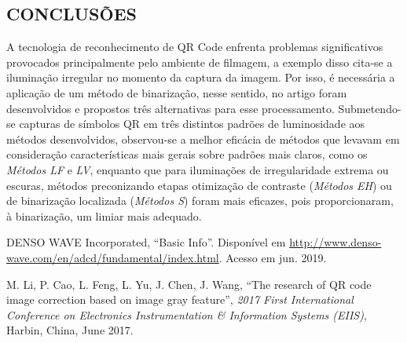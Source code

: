 \documentclass{ceel}
\begin{document}
\begin{multicols}{2}
\section{CONCLUSÕES}
A tecnologia de reconhecimento de QR Code enfrenta problemas significativos provocados principalmente pelo ambiente de filmagem, a exemplo disso cita-se a iluminação irregular no momento da captura da imagem. Por isso, é necessária a aplicação de um método de binarização, nesse sentido, no artigo foram desenvolvidos e propostos três alternativas para esse processamento. Submetendo-se capturas de símbolos QR em três distintos padrões de luminosidade aos métodos desenvolvidos, observou-se a melhor eficácia de métodos que levavam em consideração características mais gerais sobre padrões mais claros, como os \emph{Métodos LF} e \textit{LV}, enquanto que para iluminações de irregularidade extrema ou escuras, métodos preconizando etapas otimização de contraste (\emph{Métodos EH}) ou de binarização localizada (\emph{Métodos S}) foram mais eficazes, pois proporcionaram, à binarização, um limiar mais adequado.

\begin{thebibliography}{9} %

    DENSO WAVE Incorporated,
    “Basic Info”. 
    Disponível em \url{http://www.denso-wave.com/en/adcd/fundamental/index.html}. Acesso em jun. 2019.

  M. Li, P. Cao, L. Feng, L. Yu, J. Chen, J. Wang,
   “The research of QR code image correction based on image gray feature”,
   \emph{ 2017 First International Conference on Electronics Instrumentation \& Information Systems (EIIS)}, Harbin, China, June 2017.


\end{thebibliography}
\end{multicols}
\end{document}
